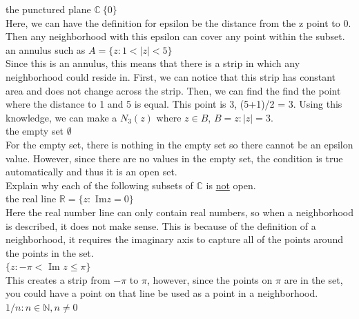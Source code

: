 \documentclass[12pt]{article}
\begin{document}
 the punctured plane $\mathbb{C} \ \{0\}$\\

Here, we can have the definition for epsilon be the distance from the z point to 0. 
Then any neighborhood with this epsilon can cover any point within the subset.\\

 an annulus such as $A = \{ z : 1 < |z| < 5 \}$ \\

Since this is an annulus, this means that there is a strip in which any neighborhood could reside in.
First, we can notice that this strip has constant area and does not change across the strip. 
Then, we can find the find the point where the distance to 1 and 5 is equal. 
This point is 3, (5+1)/2 = 3.
Using this knowledge, we can make a $N_{3}(z)$ where $z \in B$, $B = {z : |z| = 3}$.\\


 the empty set $\emptyset$ \\

For the empty set, there is nothing in the empty set so there cannot be an epsilon value.
However, since there are no values in the empty set, the condition is true automatically and thus it is an open set.\\


 Explain why each of the following subsets of $\mathbb{C}$ is \underline{not} open.\\


 the real line $\mathbb{R} = \{ z:$ Im$ z = 0\}$ \\

Here the real number line can only contain real numbers, so when a neighborhood is described, it does not make sense.
This is because of the definition of a neighborhood, it requires the imaginary axis to capture all of the points around the points in the set.\\


 $\{ z : -\pi < $ Im $z \leq \pi \}$ \\

This creates a strip from $-\pi$ to $\pi$, however, since the points on $\pi$ are in the set, you could have a point on that line be used as a point in a neighborhood.\\


 ${1/n: n \in \mathbb{N}, n \neq 0}$ \\
\end{document}
